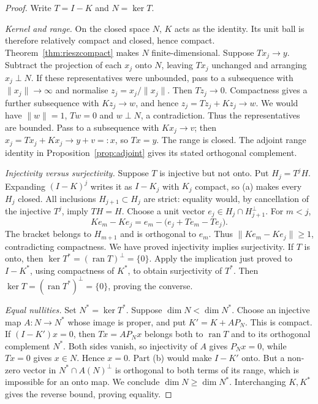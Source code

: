 \begin{proof}
Write $T=I-K$ and $N=\ker T$.

\emph{Kernel and range.} On the closed space $N$, $K$ acts as the identity. Its unit ball is therefore relatively compact and closed, hence compact. Theorem~\ref{thm:rieszcompact} makes $N$ finite-dimensional.
Suppose $Tx_j\to y$. Subtract the projection of each $x_j$ onto $N$, leaving $Tx_j$ unchanged and arranging $x_j\perp N$. If these representatives were unbounded, pass to a subsequence with $\|x_j\|\to\infty$ and normalise $z_j=x_j/\|x_j\|$. Then $Tz_j\to0$. Compactness gives a further subsequence with $Kz_j\to w$, and hence $z_j=Tz_j+Kz_j\to w$. We would have $\|w\|=1$, $Tw=0$ and $w\perp N$, a contradiction. Thus the representatives are bounded. Pass to a subsequence with $Kx_j\to v$; then $x_j=Tx_j+Kx_j\to y+v=:x$, so $Tx=y$. The range is closed. The adjoint range identity in Proposition~\ref{prop:adjoint} gives its stated orthogonal complement.

\emph{Injectivity versus surjectivity.} Suppose $T$ is injective but not onto. Put $H_j=T^jH$. Expanding $(I-K)^j$ writes it as $I-K_j$ with $K_j$ compact, so (a) makes every $H_j$ closed. All inclusions $H_{j+1}\subset H_j$ are strict: equality would, by cancellation of the injective $T^j$, imply $TH=H$. Choose a unit vector $e_j\in H_j\cap H_{j+1}^\perp$. For $m<j$,
\[
Ke_m-Ke_j=e_m-\bigl(e_j+Te_m-Te_j\bigr).
\]
The bracket belongs to $H_{m+1}$ and is orthogonal to $e_m$. Thus $\|Ke_m-Ke_j\|\ge1$, contradicting compactness. We have proved injectivity implies surjectivity.
If $T$ is onto, then $\ker T^*=(\operatorname{ran}T)^\perp=\{0\}$. Apply the implication just proved to $I-K^*$, using compactness of $K^*$, to obtain surjectivity of $T^*$. Then $\ker T=(\operatorname{ran}T^*)^\perp=\{0\}$, proving the converse.

\emph{Equal nullities.} Set $N^*=\ker T^*$. Suppose $\dim N<\dim N^*$. Choose an injective map $A:N\to N^*$ whose image is proper, and put $K'=K+AP_N$. This is compact. If $(I-K')x=0$, then $Tx=AP_Nx$ belongs both to $\operatorname{ran}T$ and to its orthogonal complement $N^*$. Both sides vanish, so injectivity of $A$ gives $P_Nx=0$, while $Tx=0$ gives $x\in N$. Hence $x=0$. Part (b) would make $I-K'$ onto. But a non-zero vector in $N^*\cap A(N)^\perp$ is orthogonal to both terms of its range, which is impossible for an onto map. We conclude $\dim N\ge\dim N^*$. Interchanging $K,K^*$ gives the reverse bound, proving equality.
\end{proof}

